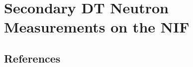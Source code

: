 \chapter{Secondary DT Neutron Measurements on the NIF}
\label{chap:secondaries}







\section*{References}

